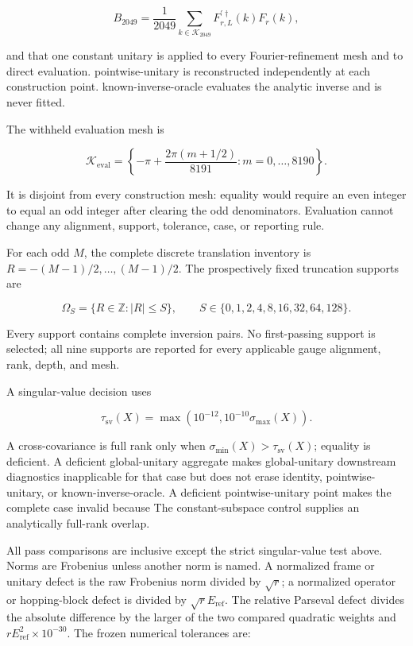 \documentclass[11pt]{article}
\begin{document}
\[
B_{2049}=\frac1{2049}\sum_{k\in\mathcal K_{2049}}
F_{r,L}^{\prime\dagger}(k)F_r(k),
\]

and that one constant unitary is applied to every Fourier-refinement mesh and to direct
evaluation. pointwise-unitary is reconstructed independently at each construction point. known-inverse-oracle evaluates
the analytic inverse and is never fitted.

The withheld evaluation mesh is

\[
\mathcal K_{\mathrm{eval}}=
\left\{-\pi+\frac{2\pi(m+1/2)}{8191}:m=0,\ldots,8190\right\}.
\]

It is disjoint from every construction mesh: equality would require an even integer to
equal an odd integer after clearing the odd denominators. Evaluation cannot change any
alignment, support, tolerance, case, or reporting rule.

For each odd $M$, the complete discrete translation inventory is
$R=-(M-1)/2,\ldots,(M-1)/2$. The prospectively fixed truncation supports are

\[
\Omega_S=\{R\in\mathbb Z:|R|\leq S\},
\qquad S\in\{0,1,2,4,8,16,32,64,128\}.
\]

Every support contains complete inversion pairs. No first-passing support is selected;
all nine supports are reported for every applicable gauge alignment, rank, depth, and mesh.

A singular-value decision uses

\[
\tau_{\mathrm{sv}}(X)=
\max\!\left(10^{-12},10^{-10}\sigma_{\max}(X)\right).
\]

A cross-covariance is full rank only when
$\sigma_{\min}(X)>\tau_{\mathrm{sv}}(X)$; equality is deficient. A deficient global-unitary
aggregate makes global-unitary downstream diagnostics inapplicable for that case but does not erase
identity, pointwise-unitary, or known-inverse-oracle. A deficient pointwise-unitary point makes the complete case invalid because The constant-subspace control supplies
an analytically full-rank overlap.

All pass comparisons are inclusive except the strict singular-value test above. Norms
are Frobenius unless another norm is named. A normalized frame or unitary defect is the
raw Frobenius norm divided by $\sqrt r$; a normalized operator or hopping-block defect is
divided by $\sqrt rE_{\mathrm{ref}}$. The relative Parseval defect divides the absolute
difference by the larger of the two compared quadratic weights and
$rE_{\mathrm{ref}}^2\times10^{-30}$. The frozen numerical tolerances are:
\end{document}
